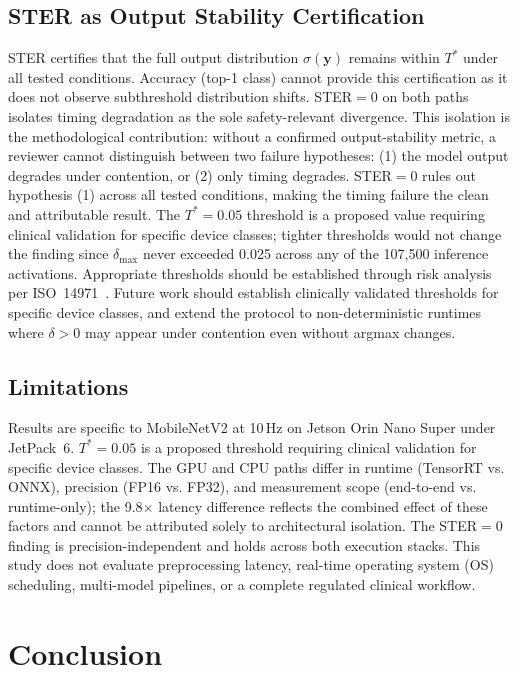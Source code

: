 \documentclass[11pt]{article}
\begin{document}
\subsection{STER as Output Stability Certification}

STER certifies that the full output distribution $\sigma(\mathbf{y})$ remains within
$T^*$ under all tested conditions. Accuracy (top-1 class) cannot provide this
certification as it does not observe subthreshold distribution shifts. STER$=0$ on
both paths isolates timing degradation as the sole safety-relevant divergence.
This isolation is the methodological contribution: without a confirmed output-stability
metric, a reviewer cannot distinguish between two failure hypotheses: (1) the model
output degrades under contention, or (2) only timing degrades. STER$=0$ rules out
hypothesis (1) across all tested conditions, making the timing failure the clean
and attributable result.
The $T^*=0.05$ threshold is a proposed value requiring clinical validation for
specific device classes; tighter thresholds would not change the finding since
$\delta_{\text{max}}$ never exceeded 0.025 across any of the 107,500 inference
activations. Appropriate thresholds should be established through risk analysis
per ISO~14971~\cite{iso14971}.
Future work should establish clinically validated thresholds for specific device
classes, and extend the protocol to non-deterministic runtimes where $\delta>0$
may appear under contention even without argmax changes.

\subsection{Limitations}

Results are specific to MobileNetV2 at 10\,Hz on Jetson Orin Nano Super under
JetPack~6. $T^*=0.05$ is a proposed threshold requiring clinical validation for
specific device classes. The GPU and CPU paths differ in runtime (TensorRT vs. ONNX),
precision (FP16 vs. FP32), and measurement scope (end-to-end vs. runtime-only);
the 9.8$\times$ latency difference reflects the combined effect of these factors and
cannot be attributed solely to architectural isolation. The STER$=0$ finding is
precision-independent and holds across both execution stacks. This study does not
evaluate preprocessing latency, real-time operating system (OS) scheduling,
multi-model pipelines, or a complete regulated clinical workflow.

\section{Conclusion}
\end{document}
